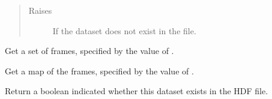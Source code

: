 \documentclass[letterpaper,10pt,english]{sphinxmanual}
\begin{document}
\begin{fulllineitems}
\begin{fulllineitems}
\begin{quote}
\begin{description}
\item[{Raises}] \leavevmode
{} \textendash{} If the dataset does not exist in the file.

\end{description}\end{quote}

\end{fulllineitems}


\begin{fulllineitems}
\label{\detokenize{xanespy:xanespy.txmstore.TXMStore.get_frames}}
Get a set of frames, specified by the value of .

\end{fulllineitems}


\begin{fulllineitems}
\label{\detokenize{xanespy:xanespy.txmstore.TXMStore.get_map}}
Get a map of the frames, specified by the value of .

\end{fulllineitems}


\begin{fulllineitems}
\label{\detokenize{xanespy:xanespy.txmstore.TXMStore.has_dataset}}
Return a boolean indicated whether this dataset exists in the HDF
file.

\end{fulllineitems}


\begin{fulllineitems}
\label{\detokenize{xanespy:xanespy.txmstore.TXMStore.intensities}}
\end{fulllineitems}


\begin{fulllineitems}
\label{\detokenize{xanespy:xanespy.txmstore.TXMStore.latest_data_name}}
\end{fulllineitems}


\end{fulllineitems}
\end{document}
